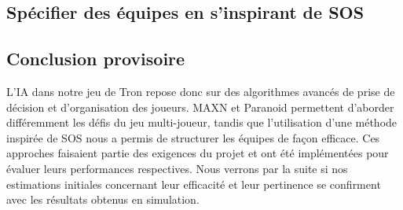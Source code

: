 \subsection{Spécifier des équipes en s'inspirant de SOS}

\subsection{Conclusion provisoire}
L'IA dans notre jeu de Tron repose donc sur des algorithmes avancés de prise de décision et d'organisation des joueurs. MAXN et Paranoid permettent d'aborder différemment les défis du jeu multi-joueur, tandis que l'utilisation d'une méthode inspirée de SOS nous a permis de structurer les équipes de façon efficace.
Ces approches faisaient partie des exigences du projet et ont été implémentées pour évaluer leurs performances respectives. Nous verrons par la suite si nos estimations initiales concernant leur efficacité et leur pertinence se confirment avec les résultats obtenus en simulation.

